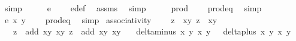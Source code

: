 \begin{isabellebody}
\ simp\isanewline
\ \ \isamarkupfalse%
\ \isamarkupfalse%
\ {\isachardoublequoteopen}e{}\ {\isacharequal}\ {}{\isachardoublequoteclose}\ \isamarkupfalse%
\ e{}{\isacharunderscore}def\ \isamarkupfalse%
\ assms{\isacharparenleft}{}{\isacharparenright}\ \isamarkupfalse%
\ simp\isanewline
\ \ \isamarkupfalse%
\ \isamarkupfalse%
\ {\isachardoublequoteopen}prod\ {\isacharequal}\ {}{\isachardoublequoteclose}\ \isamarkupfalse%
\ prod{\isacharunderscore}eq{\isacharunderscore}{}\ \isamarkupfalse%
\ simp\isanewline
\ \ \isamarkupfalse%
\ \isamarkupfalse%
\ {\isachardoublequoteopen}e\ x{}\ y{}\ {\isacharequal}\ {}{\isachardoublequoteclose}\ \isamarkupfalse%
\ prod{\isacharunderscore}eq{\isacharunderscore}{}\ \isamarkupfalse%
\ simp\isanewline
{}\isamarkupfalse%
%
\endisatagproof
{\isafoldproof}%
%
\isadelimproof
\isanewline
%
\endisadelimproof
\isanewline
{}\isamarkupfalse%
\ associativity{\isacharcolon}\ \isanewline
\ \ \ {\isachardoublequoteopen}z{}{\isacharprime}\ {\isacharequal}\ {\isacharparenleft}x{}{\isacharprime}{\isacharcomma}y{}{\isacharprime}{\isacharparenright}{\isachardoublequoteclose}\ {\isachardoublequoteopen}z{}{\isacharprime}\ {\isacharequal}\ {\isacharparenleft}x{}{\isacharprime}{\isacharcomma}y{}{\isacharprime}{\isacharparenright}{\isachardoublequoteclose}\isanewline
\ \ \ {\isachardoublequoteopen}z{}{\isacharprime}\ {\isacharequal}\ add\ {\isacharparenleft}x{}{\isacharcomma}y{}{\isacharparenright}\ {\isacharparenleft}x{}{\isacharcomma}y{}{\isacharparenright}{\isachardoublequoteclose}\ {\isachardoublequoteopen}z{}{\isacharprime}\ {\isacharequal}\ add\ {\isacharparenleft}x{}{\isacharcomma}y{}{\isacharparenright}\ {\isacharparenleft}x{}{\isacharcomma}y{}{\isacharparenright}{\isachardoublequoteclose}\isanewline
\ \ \ {\isachardoublequoteopen}delta{\isacharunderscore}minus\ x{}\ y{}\ x{}\ y{}\ {\isasymnoteq}\ {}{\isachardoublequoteclose}\ {\isachardoublequoteopen}delta{\isacharunderscore}plus\ x{}\ y{}\ x{}\ y{}\ {\isasymnoteq}\ {}{\isachardoublequoteclose}\isanewline

\end{isabellebody}
